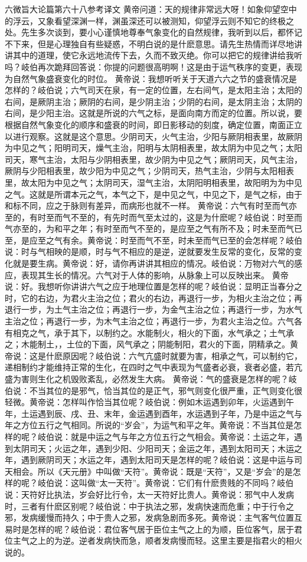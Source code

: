 \documentclass[12pt,UTF8]{ctexbook}
\begin{document}
六微旨大论篇第六十八参考译文
黄帝问道：天的规律非常远大呀！如象仰望空中的浮云，又象看望深渊一样，渊虽深还可以被测知，仰望浮云则不知它的终极之处。先生多次谈到，要小心谨慎地尊奉气象变化的自然规律，我听到以后，都怀记不下来，但是心理独自有些疑惑，不明白说的是什麽意思。请先生热情而详尽地讲讲其中的道理，使它永远地流传下去，久而不致灭绝。你可以把它的规律讲给我听吗？岐伯再次跪拜回答说：你提的问题很高明啊！这是由于运气秩序的变更，表现为自然气象盛衰变化的时位。
黄帝说：我想听听关于天道六六之节的盛衰情况是怎样的？岐伯说；六气司天在泉，有一定的位置，左右间气，是太阳主治；太阳的右间，是厥阴主治；厥阴的右间，是少阴主治；少阴的右间，是太阴主治；太阴的右间，是少阳主治。这就是所说的六气之标，是面向南方而定的位置。所以说，要根据自然气象变化的顺序和盛衰的时间，即日影移动的刻度，确定位置，南面正立以进行观察。这就是这个意思。少阴司天，火气主治，少阳与厥阴相表里，故厥阴为中见之气；阳明司天，燥气主治，阳明与太阴相表里，故太阴为中见之气；太阳司天，寒气主治，太阳与少阴相表里，故少阴为中见之气；厥阴司天，风气主治，厥阴与少阳相表里，故少阳为中见之气；少阴司天，热气主治，少阴与太阳相表里，故太阳为中见之气；太阴司天，湿气主治，太阴阳明相表里，故阳明为为中见之气。这就是所谓本元之气，本气之下，是中见之气，中见之下，是气之标，由于和标不同，应之于脉则有差异，而病形也就不一样。
黄帝说：六气有时至而气亦至的，有时至而气不至的，有先时而气至太过的，这是为什麽呢？岐伯说：时至而气亦至的，为和平之年；有时至而气不至的，是应至之气有所不及；时未至而气已至，是应至之气有余。黄帝说：时至而气不至，时未至而气已至的会怎样呢？岐伯说：时与气相映的是顺，时与气不相应的是逆，逆就要发生反常的变化，反常的变化就是要生病。黄帝说：好，请你再讲讲其相应的情况。岐伯说：万物对六气的感应，表现其生长的情况。六气对于人体的影响，从脉象上可以反映出来。
黄帝说：好。我想听你讲讲六气之应于地理位置是怎样的呢？岐伯说：显明正当春分之时，它的右边，为君火主治之位；君火的右边，再退行一步，为相火主治之位；再退行一步，为土气主治之位；再退行一步，为金气主治之位；再退行一步，为水气主治之位；再退行一步，为木气主治之位；再退行一步，为君火主治之位。六气各有相克之气，承于其下，以制约之。水能制火，相火的下面，水气承之；土气承之；木能制土，，土位的下面，风气承之；阴能制阳，君火的下面，阴精承之。黄帝说：这是什麽原因呢？岐伯说：六气亢盛时就要为害，相承之气，可以制约它，递相制约才能维持正常的生化，在四时之气中表现为气盛者必衰，衰者必盛，若亢盛为害则生化之机毁败紊乱，必然发生大病。
黄帝说：气的盛衰是怎样的呢？岐伯说：不当其位的是邪气，恰当其位的是正气，邪气则变化很严重，正气则变化很轻微。黄帝说：怎样叫作恰当其位呢？岐伯说：例如木运遇到卯年，火运遇到午年，土运遇到辰、戌、丑、末年，金运遇到酉年，水运遇到子年，乃是中运之气与年之方位五行之气相同。所说的“岁会”，为运气和平之年。黄帝说：不当其位是怎样的呢？岐伯说：就是中运之气与年之方位五行之气相会。黄帝说：土运之年，遇到太阴司天；火运之年，遇到少阳、少阳司天；金运之年，遇到太阳司天；木运之年，遇到厥阴司天；水运之年，遇到太阳司天是怎样的呢？岐伯说：这是中运与司天相会。所以《天元册》中叫做“天符”。黄帝说：既是“天符”，又是“岁会”的是怎样的呢？岐伯说：这叫做“太一天符”。黄帝说：它们有什麽贵贱的不同吗？岐伯说：天符好比执法，岁会好比行令，太一天符好比贵人。黄帝说：邪气中人发病时，三者有什麽区别呢？岐伯说：中于执法之邪，发病快速而危重；中于行令之邪，发病缓慢而持久；中于贵人之邪，发病急剧而多死。黄帝说：主气客气位置互易时是怎样的呢？岐伯说：君位客气居于臣位主气之上的为顺，臣位客气，居于君位主气之上的为逆。逆者发病快而急，顺者发病慢而轻。这里主要是指君火的相火说的。
\end{document}
